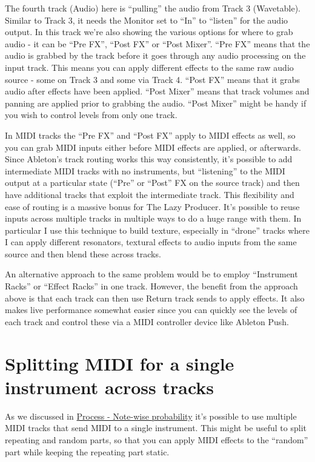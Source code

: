 \documentclass[
  12pt,
  letterpaper,
  oneside,
  open=any]{scrbook}
\makeatletter
\newcommand*\pandocbounded[1]{%
  \sbox\pandoc@box{#1}%
  \Gscale@div\@tempa{\textheight}{\dimexpr\ht\pandoc@box+\dp\pandoc@box\relax}%
  \Gscale@div\@tempb{\linewidth}{\wd\pandoc@box}%
  \ifdim\@tempb\p@<\@tempa\p@\let\@tempa\@tempb\fi%
  \ifdim\@tempa\p@<\p@\scalebox{\@tempa}{\usebox\pandoc@box}%
  \else\usebox{\pandoc@box}%
  \fi%
}
\makeatother
\begin{document}
The fourth track (Audio) here is ``pulling'' the audio from Track 3
(Wavetable). Similar to Track 3, it needs the Monitor set to ``In'' to
``listen'' for the audio output. In this track we're also showing the
various options for where to grab audio - it can be ``Pre FX'', ``Post
FX'' or ``Post Mixer''. ``Pre FX'' means that the audio is grabbed by
the track before it goes through any audio processing on the input
track. This means you can apply different effects to the same raw audio
source - some on Track 3 and some via Track 4. ``Post FX'' means that it
grabs audio after effects have been applied. ``Post Mixer'' means that
track volumes and panning are applied prior to grabbing the audio.
``Post Mixer'' might be handy if you wish to control levels from only
one track.

In MIDI tracks the ``Pre FX'' and ``Post FX'' apply to MIDI effects as
well, so you can grab MIDI inputs either before MIDI effects are
applied, or afterwards. Since Ableton's track routing works this way
consistently, it's possible to add intermediate MIDI tracks with no
instruments, but ``listening'' to the MIDI output at a particular state
(``Pre'' or ``Post'' FX on the source track) and then have additional
tracks that exploit the intermediate track. This flexibility and ease of
routing is a massive bonus for The Lazy Producer. It's possible to reuse
inputs across multiple tracks in multiple ways to do a huge range with
them. In particular I use this technique to build texture, especially in
``drone'' tracks where I can apply different resonators, textural
effects to audio inputs from the same source and then blend these across
tracks.

An alternative approach to the same problem would be to employ
``Instrument Racks'' or ``Effect Racks'' in one track. However, the
benefit from the approach above is that each track can then use Return
track sends to apply effects. It also makes live performance somewhat
easier since you can quickly see the levels of each track and control
these via a MIDI controller device like Ableton Push.

\pandocbounded{\texttt{[image: images/Routing.png]}}

\section{Splitting MIDI for a single instrument across
tracks}\label{splitting-midi-for-a-single-instrument-across-tracks}

As we discussed in \hyperref[002-Process-Note_wise_probability]{Process
- Note-wise probability} it's possible to use multiple MIDI tracks that
send MIDI to a single instrument. This might be useful to split
repeating and random parts, so that you can apply MIDI effects to the
``random'' part while keeping the repeating part static.
\end{document}
